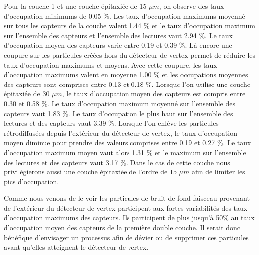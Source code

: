    Pour la couche 1 et une couche \'epitaxi\'ee de 15 $\mu m$, on observe des taux d'occupation minimums de 0.05 $\%$. Les taux d'occupation maximums moyenn\'e sur tous les capteurs de la couche valent 1.44 $\%$ et le taux d'occupation maximum sur l'ensemble des capteurs et l'ensemble des lectures vaut 2.94 $\%$. Le taux d'occupation moyen des capteurs varie entre 0.19 et 0.39 $\%$. Là encore une coupure sur les particules cr\'e\'ees hors du d\'etecteur de vertex permet de r\'eduire les taux d'occupation maximums et moyens. Avec cette coupure, les taux d'occupation maximums valent en moyenne 1.00 $\%$ et les occupations moyennes des capteurs sont comprises entre 0.13 et 0.18 $\%$. Lorsque l'on utilise une couche \'epitaxi\'ee de 30 $\mu m$, le taux d'occupation moyen des capteurs est compris entre 0.30 et 0.58 $\%$. Le taux d'occupation maximum moyenn\'e sur l'ensemble des capteurs vaut 1.83 $\%$. Le taux d'occupation le plus haut sur l'ensemble des lectures et des capteurs vaut 3.39 $\%$. Lorsque l'on enl\`eve les particules r\'etrodiffus\'ees depuis l'ext\'erieur du d\'etecteur de vertex, le taux d'occupation moyen diminue pour prendre des valeurs comprises entre 0.19 et 0.27 $\%$. Le taux d'occupation maximum moyen vaut alors 1.31 $\%$ et le maximum sur l'ensemble des lectures et des capteurs vaut 3.17 $\%$. Dans le cas de cette couche nous privil\'egierons aussi une couche \'epitaxi\'ee de l'ordre de 15 $\mu m$ afin de limiter les pics d'occupation. 
   
   \medskip

   Comme nous venons de le voir les particules de bruit de fond faisceau provenant de l'ext\'erieur du d\'etecteur de vertex participent aux fortes variabilit\'es des taux d'occupation maximums des capteurs. Ils participent de plus jusqu'\`a 50$\%$ au taux d'occupation moyen des capteurs de la premi\`ere double couche. Il serait donc b\'en\'efique d'envisager un processus afin de d\'evier ou de supprimer ces particules avant qu'elles atteignent le d\'etecteur de vertex.
   
   \medskip

